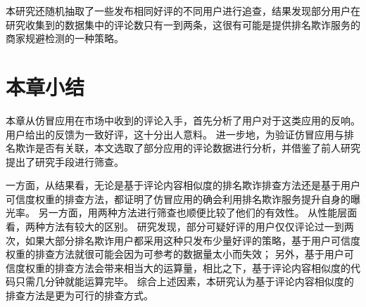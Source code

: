 本研究还随机抽取了一些发布相同好评的不同用户进行追查，结果发现部分用户在研究收集到的数据集中的评论数只有一到两条，这很有可能是提供排名欺诈服务的商家规避检测的一种策略。

\section{本章小结}
本章从仿冒应用在市场中收到的评论入手，首先分析了用户对于这类应用的反响。
用户给出的反馈为一致好评，这十分出人意料。
进一步地，为验证仿冒应用与排名欺诈是否有关联，本文选取了部分应用的评论数据进行分析，并借鉴了前人研究提出了研究手段进行筛查。

一方面，从结果看，无论是基于评论内容相似度的排名欺诈排查方法还是基于用户可信度权重的排查方法，都证明了仿冒应用的确会利用排名欺诈服务提升自身的曝光率。
另一方面，用两种方法进行筛查也顺便比较了他们的有效性。
从性能层面看，两种方法有较大的区别。
研究发现，部分可疑好评的用户仅仅评论过一到两次，如果大部分排名欺诈用户都采用这种只发布少量好评的策略，基于用户可信度权重的排查方法就很可能会因为可参考的数据量太小而失效；
另外，基于用户可信度权重的排查方法会带来相当大的运算量，相比之下，基于评论内容相似度的代码只需几分钟就能运算完毕。
综合上述因素，本研究认为基于评论内容相似度的排查方法是更为可行的排查方式。
